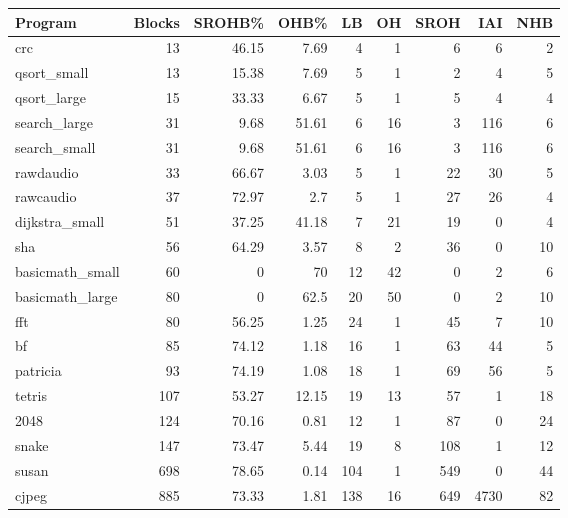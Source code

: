 \begin{tabular}{lrrrrrrrr}
\hline
 Program         &   Blocks &   SROHB\% &   OHB\% &   LB &   OH &   SROH &   IAI &   NHB \\
\hline
 crc             &       13 &    46.15 &   7.69 &    4 &    1 &      6 &     6 &     2 \\
 qsort\_small     &       13 &    15.38 &   7.69 &    5 &    1 &      2 &     4 &     5 \\
 qsort\_large     &       15 &    33.33 &   6.67 &    5 &    1 &      5 &     4 &     4 \\
 search\_large    &       31 &     9.68 &  51.61 &    6 &   16 &      3 &   116 &     6 \\
 search\_small    &       31 &     9.68 &  51.61 &    6 &   16 &      3 &   116 &     6 \\
 rawdaudio       &       33 &    66.67 &   3.03 &    5 &    1 &     22 &    30 &     5 \\
 rawcaudio       &       37 &    72.97 &   2.7  &    5 &    1 &     27 &    26 &     4 \\
 dijkstra\_small  &       51 &    37.25 &  41.18 &    7 &   21 &     19 &     0 &     4 \\
 sha             &       56 &    64.29 &   3.57 &    8 &    2 &     36 &     0 &    10 \\
 basicmath\_small &       60 &     0    &  70    &   12 &   42 &      0 &     2 &     6 \\
 basicmath\_large &       80 &     0    &  62.5  &   20 &   50 &      0 &     2 &    10 \\
 fft             &       80 &    56.25 &   1.25 &   24 &    1 &     45 &     7 &    10 \\
 bf              &       85 &    74.12 &   1.18 &   16 &    1 &     63 &    44 &     5 \\
 patricia        &       93 &    74.19 &   1.08 &   18 &    1 &     69 &    56 &     5 \\
 tetris          &      107 &    53.27 &  12.15 &   19 &   13 &     57 &     1 &    18 \\
 2048            &      124 &    70.16 &   0.81 &   12 &    1 &     87 &     0 &    24 \\
 snake           &      147 &    73.47 &   5.44 &   19 &    8 &    108 &     1 &    12 \\
 susan           &      698 &    78.65 &   0.14 &  104 &    1 &    549 &     0 &    44 \\
 cjpeg           &      885 &    73.33 &   1.81 &  138 &   16 &    649 &  4730 &    82 \\

\end{tabular}
